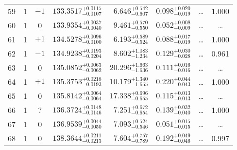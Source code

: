 \begin{table*}[!]
\begin{tabular}{llcrrlrc}
59 & 1 & $-1$ & $    133.3517_{-      0.0107}^{+      0.0115}$ & $       6.646_{-       0.607}^{+       0.542}$ & $       0.098_{-       0.019}^{+       0.020}$ & \multicolumn{1}{c}{\dots} & 1.000\\[1pt]
60 & 1 & 0 & $    133.9354_{-      0.0040}^{+      0.0037}$ & $       9.461_{-       0.550}^{+       0.570}$ & $       0.052_{-       0.009}^{+       0.008}$ & \multicolumn{1}{c}{\dots} & \dots \\[1pt]
61 & 1 & $+1$ & $    134.5278_{-      0.0100}^{+      0.0096}$ & $       6.193_{-       0.524}^{+       0.589}$ & $       0.088_{-       0.019}^{+       0.017}$ & \multicolumn{1}{c}{\dots} & 1.000\\[1pt]
62 & 1 & $-1$ & $    134.9238_{-      0.0204}^{+      0.0193}$ & $       8.602_{-       1.234}^{+       1.083}$ & $       0.129_{-       0.028}^{+       0.030}$ & \multicolumn{1}{c}{\dots} & 0.961\\[1pt]
63 & 1 & 0 & $    135.0852_{-      0.0062}^{+      0.0063}$ & $      20.296_{-       1.636}^{+       1.663}$ & $       0.111_{-       0.016}^{+       0.016}$ & \multicolumn{1}{c}{\dots} & \dots \\[1pt]
64 & 1 & $+1$ & $    135.3753_{-      0.0193}^{+      0.0218}$ & $      10.179_{-       1.655}^{+       1.340}$ & $       0.220_{-       0.043}^{+       0.044}$ & \multicolumn{1}{c}{\dots} & 1.000\\[1pt]
65 & 1 & 0 & $    135.8142_{-      0.0064}^{+      0.0064}$ & $      17.338_{-       0.655}^{+       0.696}$ & $       0.115_{-       0.013}^{+       0.013}$ & \multicolumn{1}{c}{\dots} & \dots \\[1pt]
66 & 1 & ? & $    136.3724_{-      0.0146}^{+      0.0148}$ & $       7.251_{-       0.654}^{+       0.672}$ & $       0.139_{-       0.040}^{+       0.032}$ & \multicolumn{1}{c}{\dots} & 1.000\\[1pt]
67 & 1 & 0 & $    136.9539_{-      0.0050}^{+      0.0044}$ & $       7.093_{-       0.546}^{+       0.524}$ & $       0.051_{-       0.015}^{+       0.015}$ & \multicolumn{1}{c}{\dots} & \dots \\[1pt]
68 & 1 & 0 & $    138.3644_{-      0.0213}^{+      0.0211}$ & $       7.604_{-       0.789}^{+       0.757}$ & $       0.192_{-       0.046}^{+       0.049}$ & \multicolumn{1}{c}{\dots} & 0.997\\[1pt]


\end{tabular}
\end{table*}
